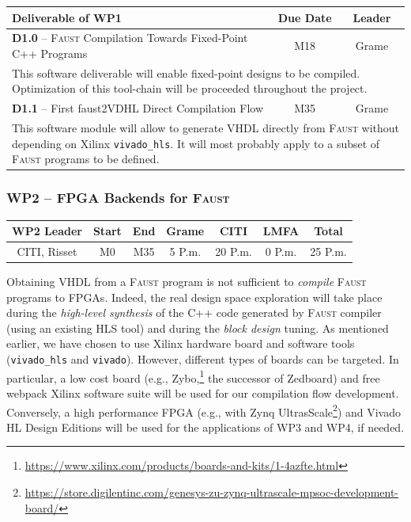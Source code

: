 \documentclass[a4paper,9pt]{extarticle}
\newcommand{\F}{\textsc{Faust}}
\begin{document}
\begin{center}
\begin{tabular}{p{12cm} | c | c}
\textbf{Deliverable of WP1} & \textbf{Due Date} & \textbf{Leader}\\
\hline
\hline
\textbf{D1.0} -- \F{} Compilation Towards Fixed-Point C++ Programs & M18 & Grame\\
\hline
\multicolumn{3}{p{16cm}}{This software deliverable will enable fixed-point designs to be compiled. Optimization of this tool-chain will be proceeded throughout the project.}\\
\hline
\hline
\textbf{D1.1} -- First faust2VDHL Direct Compilation Flow & M35 & Grame\\
\hline
\multicolumn{3}{p{16cm}}{This software module will allow to generate VHDL directly from \F{} without depending on Xilinx {\tt vivado\_hls}. It will most probably apply to a subset of \F{} programs to be defined.}\\
\end{tabular}
\end{center}

\subsubsection{WP2 -- FPGA Backends for \F{}}

\begin{center}
\begin{tabular}{c | c c | c c c | c}
\textbf{WP2 Leader} & \textbf{Start} & \textbf{End} & \textbf{Grame} & \textbf{CITI} & \textbf{LMFA} & \textbf{Total}\\
\hline
CITI, Risset & M0 & M35 & 5 P.m. & 20 P.m. & 0 P.m. & 25 P.m.
\end{tabular}
\end{center}

Obtaining VHDL from a \F{} program is not sufficient to {\em compile} \F{} programs to FPGAs. Indeed, the real design space exploration will take place during the {\em high-level synthesis} of the C++ code generated by \F{} compiler (using an existing HLS tool) and during the {\em block design} tuning. As mentioned earlier, we have chosen to use Xilinx hardware board and software tools ({\tt vivado\_hls} and {\tt vivado}). However, different types of boards can be targeted. In particular, a low cost board (e.g., Zybo,\footnote{\url{https://www.xilinx.com/products/boards-and-kits/1-4azfte.html}} the successor of Zedboard) and free webpack Xilinx software suite will be used for our compilation flow development. Conversely, a high performance FPGA (e.g., with Zynq UltrasScale\footnote{\url{https://store.digilentinc.com/genesys-zu-zynq-ultrascale-mpsoc-development-board/}}) and Vivado HL Design Editions will be used for the applications of WP3 and WP4, if needed.  
\end{document}
